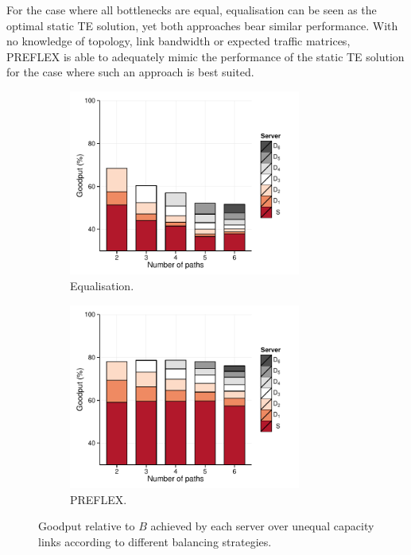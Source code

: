 For the case where all bottlenecks are equal, equalisation can be seen as the optimal static TE solution, yet both approaches bear similar performance. 
With no knowledge of topology, link bandwidth or expected traffic matrices, \ac{PREFLEX} is able to adequately mimic the performance of the static TE solution for the case where such an approach is best suited.

\begin{figure}
    \centering
    \begin{subfigure}[b]{.5\linewidth}
        \centering
        \includegraphics[width=3.0in]{figures/cate/equal-diff}
        \caption{\label{eqdiff}Equalisation.}
    \end{subfigure}%
    \begin{subfigure}[b]{.5\linewidth}
        \centering
        \includegraphics[width=3.0in]{figures/cate/preflex-diff}
        \caption{\label{preflexdiff}PREFLEX.}
    \end{subfigure}
    \caption[Goodput achieved over unequal capacity links.]{Goodput relative to $B$ achieved by each server over unequal capacity links according to different balancing strategies.\label{fig:goodputdiff}}
\end{figure}

